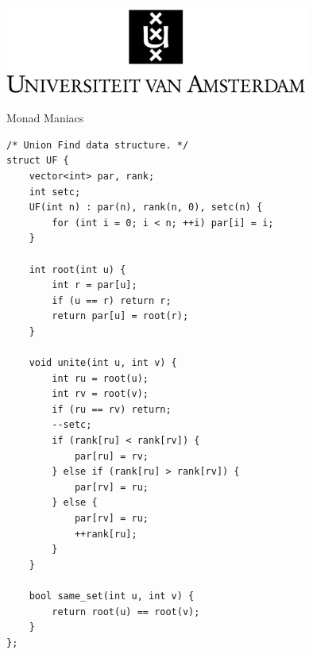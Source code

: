 \documentclass[a4paper,10pt]{article}
\newenvironment{keepfunction}{\begin{samepage}}{\end{samepage}}
\begin{document}
\begin{titlepage}
    \centering
    \vspace*{\fill} %
    
    \includegraphics[width=0.75\textwidth]{universiteit-van-amsterdam-logo-png-transparent-2300688522.png} %
    
    \vspace{1cm} %
    
    {\Large Monad Maniacs \par}
    
    \vspace*{\fill} %
\end{titlepage}

\begin{keepfunction}
\begin{verbatim}
/* Union Find data structure. */
struct UF {
    vector<int> par, rank;
    int setc;
    UF(int n) : par(n), rank(n, 0), setc(n) {
        for (int i = 0; i < n; ++i) par[i] = i;
    }

    int root(int u) {
        int r = par[u];
        if (u == r) return r;
        return par[u] = root(r);
    }

    void unite(int u, int v) {
        int ru = root(u);
        int rv = root(v);
        if (ru == rv) return;
        --setc;
        if (rank[ru] < rank[rv]) {
            par[ru] = rv;
        } else if (rank[ru] > rank[rv]) {
            par[rv] = ru;
        } else {
            par[rv] = ru;
            ++rank[ru];
        }
    }

    bool same_set(int u, int v) {
        return root(u) == root(v);
    }
};
\end{verbatim}
\end{keepfunction}
\end{document}
